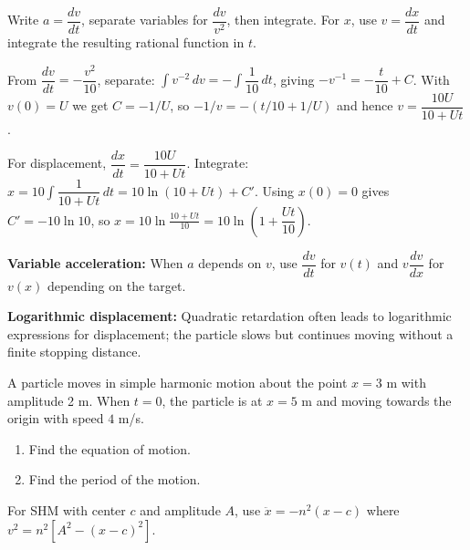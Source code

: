 \begin{hint}
Write $a=\dfrac{dv}{dt}$, separate variables for $\dfrac{dv}{v^2}$, then integrate. For $x$, use $v=\dfrac{dx}{dt}$ and integrate the resulting rational function in $t$.
\end{hint}

\begin{solution}
From $\dfrac{dv}{dt}=-\dfrac{v^2}{10}$, separate: $\int v^{-2}\,dv=-\int \dfrac{1}{10}\,dt$, giving $-v^{-1}=-\dfrac{t}{10}+C$. With $v(0)=U$ we get $C=-1/U$, so $-1/v=-(t/10+1/U)$ and hence $v=\dfrac{10U}{10+Ut}$. 

For displacement, $\dfrac{dx}{dt}=\dfrac{10U}{10+Ut}$. Integrate: $x=10\int\dfrac{1}{10+Ut}\,dt =10\ln(10+Ut)+C'$. Using $x(0)=0$ gives $C'=-10\ln 10$, so $x=10\ln\frac{10+Ut}{10}=10\ln\left(1+\dfrac{Ut}{10}\right)$.
\end{solution}

\begin{takeaways}
\item \textbf{Variable acceleration:} When $a$ depends on $v$, use $\dfrac{dv}{dt}$ for $v(t)$ and $v\dfrac{dv}{dx}$ for $v(x)$ depending on the target.
\item \textbf{Logarithmic displacement:} Quadratic retardation often leads to logarithmic expressions for displacement; the particle slows but continues moving without a finite stopping distance.
\end{takeaways}

\begin{problem}
A particle moves in simple harmonic motion about the point $x = 3$ m with amplitude 2 m. When $t = 0$, the particle is at $x = 5$ m and moving towards the origin with speed $4$ m/s.

\begin{enumerate}[label=\textbf{\roman*.}]
    \item Find the equation of motion.
    \item Find the period of the motion.
\end{enumerate}
\end{problem}

\begin{hint}
For SHM with center $c$ and amplitude $A$, use $\ddot{x} = -n^2(x - c)$ where $v^2 = n^2[A^2 - (x-c)^2]$.
\end{hint}

